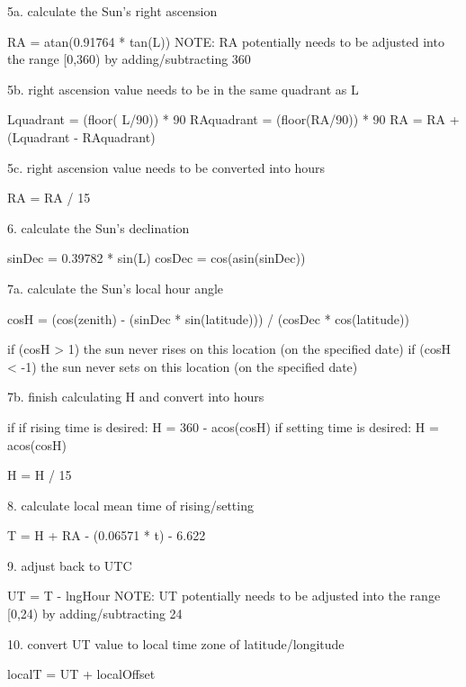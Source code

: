 5a. calculate the Sun's right ascension
	
	RA = atan(0.91764 * tan(L))
	NOTE: RA potentially needs to be adjusted into the range [0,360) by adding/subtracting 360

5b. right ascension value needs to be in the same quadrant as L

	Lquadrant  = (floor( L/90)) * 90
	RAquadrant = (floor(RA/90)) * 90
	RA = RA + (Lquadrant - RAquadrant)

5c. right ascension value needs to be converted into hours

	RA = RA / 15

6. calculate the Sun's declination

	sinDec = 0.39782 * sin(L)
	cosDec = cos(asin(sinDec))

7a. calculate the Sun's local hour angle
	
	cosH = (cos(zenith) - (sinDec * sin(latitude))) / (cosDec * cos(latitude))
	
	if (cosH >  1) 
	  the sun never rises on this location (on the specified date)
	if (cosH < -1)
	  the sun never sets on this location (on the specified date)

7b. finish calculating H and convert into hours
	
	if if rising time is desired:
	  H = 360 - acos(cosH)
	if setting time is desired:
	  H = acos(cosH)
	
	H = H / 15

8. calculate local mean time of rising/setting
	
	T = H + RA - (0.06571 * t) - 6.622

9. adjust back to UTC
	
	UT = T - lngHour
	NOTE: UT potentially needs to be adjusted into the range [0,24) by adding/subtracting 24

10. convert UT value to local time zone of latitude/longitude
	
	localT = UT + localOffset


